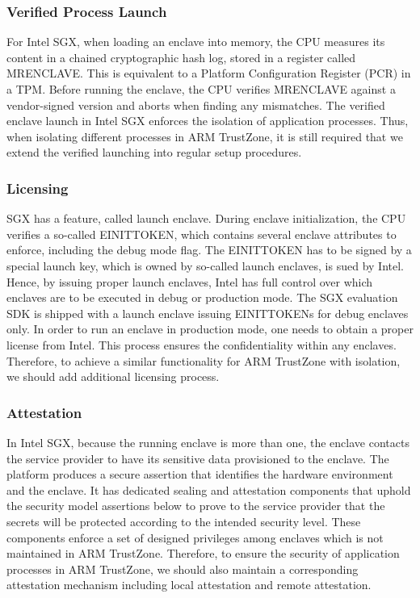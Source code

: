 \subsubsection{Verified Process Launch} 
For Intel SGX, when loading an enclave into memory, the CPU measures its 
content in a chained cryptographic hash log, stored in a register called 
MRENCLAVE. This is equivalent to a Platform Configuration Register (PCR) in a 
TPM. Before running the enclave, the CPU verifies MRENCLAVE against a 
vendor-signed version and aborts when finding any mismatches. The verified
enclave launch in Intel SGX enforces the isolation of application processes.
Thus, when isolating different processes in ARM TrustZone, it is still 
required that we extend the verified launching into regular setup procedures.

\subsubsection{Licensing}
SGX has a feature, called launch enclave. During
enclave initialization, the CPU verifies a so-called EINITTOKEN, which 
contains several enclave attributes to enforce, including the debug mode flag. 
The EINITTOKEN has to be signed by a special launch key, which is owned by 
so-called launch enclaves, is sued by Intel. Hence, by issuing proper launch 
enclaves, Intel has full control over which enclaves are to be executed in 
debug or production mode. The SGX evaluation SDK is shipped with a launch 
enclave issuing EINITTOKENs for debug enclaves only. In order to run an 
enclave in production mode, one needs to obtain a proper license from Intel.
This process ensures the confidentiality within any enclaves. Therefore, to
achieve a similar functionality for ARM TrustZone with isolation, we should 
add additional licensing process.

\subsubsection{Attestation}
In Intel SGX, because the running enclave is more than one, the enclave 
contacts the service provider to have its sensitive data provisioned to the 
enclave. The platform produces a secure assertion that identifies the hardware 
environment and the enclave. It has dedicated sealing and attestation 
components that uphold the security model assertions below to prove to the 
service provider that the secrets will be protected according to the intended 
security level. These components enforce a set of designed privileges among
enclaves which is not maintained in ARM TrustZone. Therefore, to ensure the 
security of application processes in ARM TrustZone, we should also maintain
a corresponding attestation mechanism including local attestation and remote
attestation.
